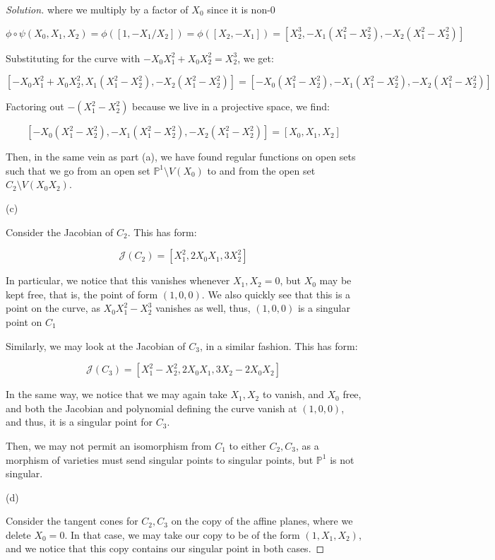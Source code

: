 \documentclass[10pt]{article}
\begin{document}
\begin{proof}[Solution]
where we multiply by a factor of $X_0$ since it is non-0

$$\phi \circ \psi(X_0,X_1, X_2) = \phi([1,-X_1/X_2]) = \phi([X_2,-X_1]) = [X_2^3, -X_1(X_1^2-X_2^2), -X_2(X_1^2 - X_2^2)]$$

Substituting for the curve with $-X_0X_1^2  + X_0X_2^2 = X_2^3$, we get:

$$ [-X_0X_1^2  + X_0X_2^2, X_1(X_1^2-X_2^2), -X_2(X_1^2 - X_2^2)] =  [-X_0(X_1^2  - X_2^2), -X_1(X_1^2-X_2^2), -X_2(X_1^2 - X_2^2)]$$

Factoring out $-(X_1^2 - X_2^2)$ because we live in a projective space, we find:

$$[-X_0(X_1^2  - X_2^2), -X_1(X_1^2-X_2^2), -X_2(X_1^2 - X_2^2)] = [X_0,X_1,X_2]$$

Then, in the same vein as part (a), we have found regular functions on open sets such that we go from an open set $\mathbb{P}^1 \setminus V(X_0)$ to and from the open set $C_2 \setminus V(X_0X_2)$.

(c)

Consider the Jacobian of $C_2$. This has form:

$$\mathcal{J}(C_2) = [ X_1^2 , 2X_0X_1, 3X_2^2 ]$$

In particular, we notice that this vanishes whenever $X_1, X_2 = 0$, but $X_0$ may be kept free, that is, the point of form $(1,0,0)$. We also quickly see that this is a point on the curve, as $X_0 X_1^2 - X_2^3$ vanishes as well, thus, $(1,0,0)$ is a singular point on $C_1$

Similarly, we may look at the Jacobian of $C_3$, in a similar fashion. This has form:

$$\mathcal{J}(C_3) = [ X_1^2 - X_2^2 , 2X_0X_1, 3X_2 - 2X_0X_2 ]$$

In the same way, we notice that we may again take $X_1, X_2$ to vanish, and $X_0$ free, and both the Jacobian and polynomial defining the curve vanish at $(1,0,0)$, and thus, it is a singular point for $C_3$.

Then, we may not permit an isomorphism from $C_1$ to either $C_2, C_3$, as a morphism of varieties must send singular points to singular points, but $\mathbb{P}^1$ is not singular. 

(d)

Consider the tangent cones for $C_2,C_3$ on the copy of the affine planes, where we delete $X_0 = 0$. In that case, we may take our copy to be of the form $(1,X_1,X_2)$, and we notice that this copy contains our singular point in both cases.


\end{proof}
\end{document}
